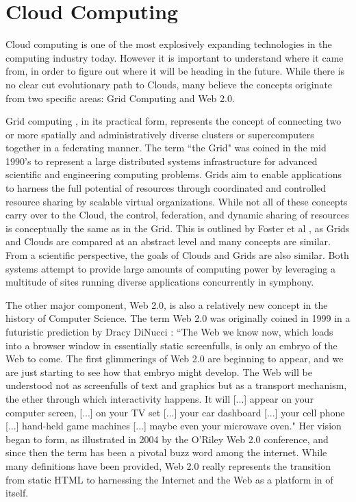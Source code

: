 \section{Cloud Computing}
\label{sec:cloudcomputing}

Cloud computing \cite{Armbrust2010} is one of the most explosively expanding technologies in the computing industry today. However it is important to understand where it came from, in order to figure out where it will be heading in the future.  While there is no clear cut evolutionary path to Clouds, many believe the concepts originate from two specific areas: Grid Computing and Web 2.0.

Grid computing \cite{foster2001a, foster2002b}, in its practical form, represents the concept of connecting two or more spatially and administratively diverse clusters or supercomputers together in a federating manner.  The term ``the Grid" was coined in the mid 1990's to represent a large distributed systems infrastructure for advanced scientific and engineering computing problems. Grids aim to enable applications to harness the full potential of resources through coordinated and controlled resource sharing by scalable virtual organizations.  While not all of these concepts carry over to the Cloud, the control, federation, and dynamic sharing of resources is conceptually the same as in the Grid.  This is outlined by Foster et al \cite{foster2008cca}, as Grids and Clouds are compared at an abstract level and many concepts are similar.  From a scientific perspective, the goals of Clouds and Grids are also similar.  Both systems attempt to provide large amounts of computing power by leveraging a multitude of sites running diverse applications concurrently in symphony. 


The other major component, Web 2.0, is also a relatively new concept in the history of Computer Science.  The term Web 2.0 was originally coined in 1999 in a futuristic prediction by Dracy DiNucci \cite{dinucci1999fragmented}: ``The Web we know now, which loads into a browser window in essentially static screenfulls, is only an embryo of the Web to come. The first glimmerings of Web 2.0 are beginning to appear, and we are just starting to see how that embryo might develop. The Web will be understood not as screenfulls of text and graphics but as a transport mechanism, the ether through which interactivity happens. It will [...] appear on your computer screen, [...] on your TV set [...] your car dashboard [...] your cell phone [...] hand-held game machines [...] maybe even your microwave oven."  Her vision began to form, as illustrated in 2004 by the O'Riley Web 2.0 conference, and since then the term has been a pivotal buzz word among the internet.  While many definitions have been provided, Web 2.0 really represents the transition from static HTML to harnessing the Internet and the Web as a platform in of itself.  

